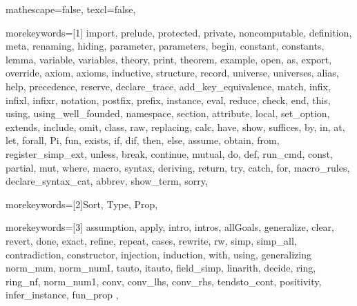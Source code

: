 
 {

mathescape=false,
texcl=false,

morekeywords=[1]{
import, prelude, protected, private, noncomputable, definition, meta, renaming,
hiding, parameter, parameters, begin, constant, constants,
lemma, variable, variables, theory,
print, theorem, example,
open, as, export, override, axiom, axioms, inductive,
structure, record, universe, universes,
alias, help, precedence, reserve, declare_trace, add_key_equivalence,
match, infix, infixl, infixr, notation, postfix, prefix, instance,
eval, reduce, check, end, this,
using, using_well_founded, namespace, section,
attribute, local, set_option, extends, include, omit, class,
raw, replacing,
calc, have, show, suffices, by, in, at, let, forall, Pi, fun,
exists, if, dif, then, else, assume, obtain, from, register_simp_ext, unless, break, continue,
mutual, do, def, run_cmd, const,
partial, mut, where, macro, syntax, deriving,
return, try, catch, for, macro_rules, declare_syntax_cat, abbrev,
show_term, sorry},

morekeywords=[2]{Sort, Type, Prop},

morekeywords=[3]{
assumption,
apply, intro, intros, allGoals,
generalize, clear, revert, done, exact,
refine, repeat, cases, rewrite, rw,
simp, simp_all, contradiction,
constructor, injection,
induction, with, using, generalizing
norm_num, norm_numI, tauto, itauto, field_simp, linarith, decide, ring, ring_nf, norm_num1, conv, conv_lhs, conv_rhs, tendsto_cont, positivity, infer_instance, fun_prop
},


}
